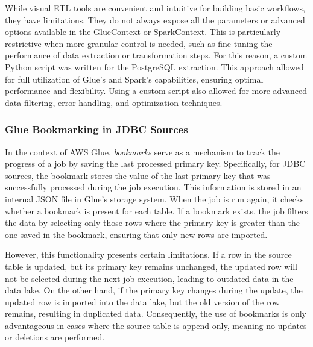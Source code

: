While visual ETL tools are convenient and intuitive for building basic workflows, they have limitations. They do not always expose all the parameters or advanced options available in the GlueContext or SparkContext. This is particularly restrictive when more granular control is needed, such as fine-tuning the performance of data extraction or transformation steps. For this reason, a custom Python script was written for the PostgreSQL extraction. This approach allowed for full utilization of Glue's and Spark's capabilities, ensuring optimal performance and flexibility. Using a custom script also allowed for more advanced data filtering, error handling, and optimization techniques.


\subsubsection{Glue Bookmarking in JDBC Sources}

In the context of AWS Glue, \textit{bookmarks} serve as a mechanism to track the progress of a job by saving the last processed primary key. Specifically, for JDBC sources, the bookmark stores the value of the last primary key that was successfully processed during the job execution. This information is stored in an internal JSON file in Glue's storage system. When the job is run again, it checks whether a bookmark is present for each table. If a bookmark exists, the job filters the data by selecting only those rows where the primary key is greater than the one saved in the bookmark, ensuring that only new rows are imported.

However, this functionality presents certain limitations. If a row in the source table is updated, but its primary key remains unchanged, the updated row will not be selected during the next job execution, leading to outdated data in the data lake. On the other hand, if the primary key changes during the update, the updated row is imported into the data lake, but the old version of the row remains, resulting in duplicated data. Consequently, the use of bookmarks is only advantageous in cases where the source table is append-only, meaning no updates or deletions are performed.

